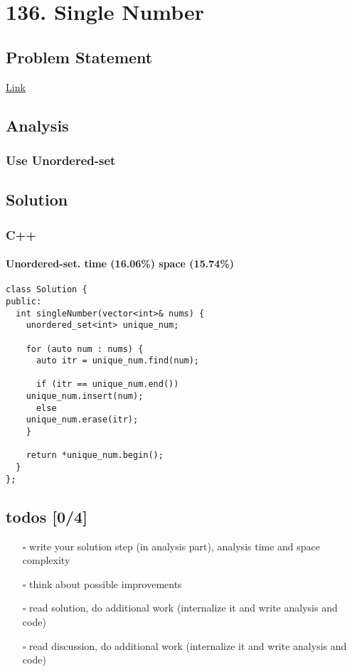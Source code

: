 \documentclass[12pt]{book}
\begin{document}
\chapter{136. Single Number}
\label{sec:org44fefa3}
\section{Problem Statement}
\label{sec:org2f3a3a3}
\href{https://leetcode.com/problems/single-number/}{Link
}
\section{Analysis}
\label{sec:orgbe6b357}
\subsection{Use Unordered-set}
\label{sec:org3d4bab8}
\section{Solution}
\label{sec:org88ecccb}
\subsection{C++}
\label{sec:orgcc425c0}
\subsubsection{Unordered-set. time (16.06\%) space (15.74\%)}
\label{sec:orgfdf8353}
\begin{verbatim}
class Solution {
public:
  int singleNumber(vector<int>& nums) {
    unordered_set<int> unique_num;

    for (auto num : nums) {
      auto itr = unique_num.find(num);

      if (itr == unique_num.end())
	unique_num.insert(num);
      else
	unique_num.erase(itr);
    }

    return *unique_num.begin();
  }
};
\end{verbatim}
\section{todos [0/4]}
\label{sec:orga325190}
\begin{itemize}
\item[{$\square$}] write your solution step (in analysis part), analysis time and space complexity
\item[{$\square$}] think about possible improvements
\item[{$\square$}] read solution, do additional work (internalize it and write analysis and code)
\item[{$\square$}] read discussion, do additional work (internalize it and write analysis and code)
\end{itemize}
\end{document}
